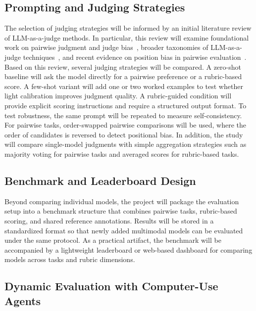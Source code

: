 \documentclass[pdflatex,sn-mathphys-num]{sn-jnl}
\begin{document}
\subsection{Prompting and Judging Strategies}

The selection of judging strategies will be informed by an initial literature review of
LLM-as-a-judge methods. In particular, this review will examine foundational work on
pairwise judgment and judge bias~\cite{llm_judge}, broader taxonomies of
LLM-as-a-judge techniques~\cite{li-etal-2025-generation}, and recent evidence on
position bias in pairwise evaluation~\cite{shi-etal-2025-judging}. Based on this
review, several judging strategies will be compared. A zero-shot baseline will ask the
model directly for a pairwise preference or a rubric-based score. A few-shot variant
will add one or two worked examples to test whether light calibration improves judgment
quality. A rubric-guided condition will provide explicit scoring instructions and
require a structured output format. To test robustness, the same prompt will be
repeated to measure self-consistency. For pairwise tasks, order-swapped pairwise
comparisons will be used, where the order of candidates is reversed to detect
positional bias. In addition, the study will compare single-model judgments with simple
aggregation strategies such as majority voting for pairwise tasks and averaged scores
for rubric-based tasks.

\subsection{Benchmark and Leaderboard Design}

Beyond comparing individual models, the project will package the evaluation setup into
a benchmark structure that combines pairwise tasks, rubric-based scoring, and shared
reference annotations. Results will be stored in a standardized format so that newly
added multimodal models can be evaluated under the same protocol. As a practical
artifact, the benchmark will be accompanied by a lightweight leaderboard or web-based
dashboard for comparing models across tasks and rubric dimensions.

\subsection{Dynamic Evaluation with Computer-Use Agents}
\end{document}

